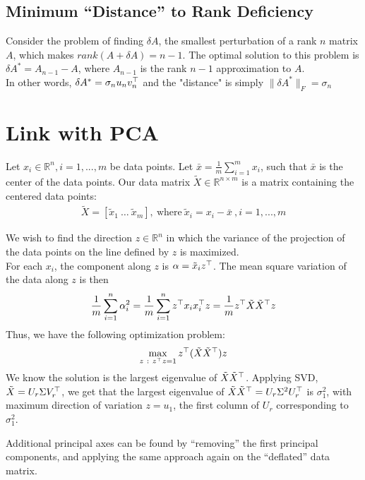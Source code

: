 \documentclass[12pt]{article}
\begin{document}
\subsection*{Minimum “Distance” to Rank Deficiency}
Consider the problem of finding $\delta A$, the smallest perturbation of a rank $n$ matrix $A$, which makes $rank(A + \delta A) = n - 1$. The optimal solution to this problem is $\delta A^* = A_{n-1} - A$, where $A_{n-1}$ is the rank $n-1$ approximation to $A$.\\

\noindent In other words, $\delta A^* = \sigma_nu_nv_n^\top$ and the "distance" is simply $\|\delta A^*\|_F = \sigma_n$
\section{Link with PCA}
Let $x_i \in \mathbb{R}^n,i= 1,...,m$ be data points.
Let $\bar{x}=\frac{1}{m}\sum_{i=1}^m x_i$, such that $\bar{x}$ is the center of the data points. Our data matrix $ \tilde{X} \in \mathbb{R}^{n\times m}$ is a matrix containing the centered data points:
\begin{gather*}
    \tilde{X}= [ \tilde{x}_1 \ \hdots \ \tilde{x}_m], \ \text{where} \ \tilde{x}_i = x_i - \bar{x} \ ,i=1,...,m
\end{gather*}

We wish to find the direction $z \in \mathbb{R}^n$ in which the variance of the projection of the data points on the line defined by $z$ is maximized.\\
For each $x_i$, the component along $z$ is $\alpha = \tilde{x}_i z^\top$. The mean square variation of the data along $z$ is then
\begin{gather*}
    \frac{1}{m}\sum_{i=1}^n \alpha_i^2 = \frac{1}{m}\sum_{i=1}^n z^\top x_i x_i^\top z = \frac{1}{m} z^\top \tilde{X} \tilde{X}^\top z
\end{gather*}
Thus, we have the following optimization problem:
\begin{gather*}
    \max_{z \ : \ z^\top z = 1} z^\top (\tilde{X} \tilde{X}^\top) z
\end{gather*}
We know the solution is the largest eigenvalue of $\tilde{X} \tilde{X}^\top$.
Applying SVD, $\tilde{X} = U_r\Sigma V_r^\top$, we get that the largest eigenvalue of $\tilde{X} \tilde{X}^\top = U_r\Sigma^2 U_r^\top$ is $\sigma_1^2$, with maximum direction of variation $z = u_1$, the first column of $U_r$ corresponding to $\sigma_1^2$.

Additional principal axes can be found by “removing” the first principal components, and applying the same approach again on the “deflated” data matrix.
\nocite{*}


\end{document}
